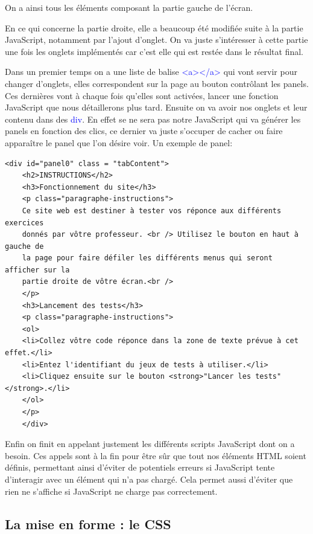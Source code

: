 \documentclass[a4paper]{article}
\renewcommand{\texttt}[2][blue]{\textcolor{#1}{\ttfamily #2}}
\begin{document}
  On a ainsi tous les éléments composant la partie gauche de l'écran.

  En ce qui concerne la partie droite, elle a beaucoup été modifiée suite à la
  partie JavaScript, notamment par l'ajout d'onglet. On va juste s'intéresser à
  cette partie une fois les onglets implémentés car c'est elle qui est restée dans le résultat
  final.

  Dans un premier temps on a une liste de balise \texttt{<a></a>} qui vont
  servir pour changer d'onglets, elles correspondent sur la page au bouton
  contrôlant les panels. Ces dernières vont à chaque fois qu'elles sont
  activées, lancer une fonction JavaScript que nous détaillerons plus tard.
  Ensuite on va avoir nos onglets et leur contenu dans des \texttt{div}. En
  effet se ne sera pas notre JavaScript qui va générer les panels en fonction
  des clics, ce dernier va juste s'occuper de cacher ou faire apparaître le
  panel que l'on désire voir. Un exemple de panel:

  \begin{lstlisting}[language=HTML5]
    <div id="panel0" class = "tabContent">
    <h2>INSTRUCTIONS</h2>
    <h3>Fonctionnement du site</h3>
    <p class="paragraphe-instructions">
    Ce site web est destiner à tester vos réponce aux différents exercices
    donnés par vôtre professeur. <br /> Utilisez le bouton en haut à gauche de
    la page pour faire défiler les différents menus qui seront afficher sur la
    partie droite de vôtre écran.<br />
    </p>
    <h3>Lancement des tests</h3>
    <p class="paragraphe-instructions">
    <ol>
    <li>Collez vôtre code réponce dans la zone de texte prévue à cet effet.</li>
    <li>Entez l'identifiant du jeux de tests à utiliser.</li>
    <li>Cliquez ensuite sur le bouton <strong>"Lancer les tests"</strong>.</li>
    </ol>
    </p>
    </div>
  \end{lstlisting}

  Enfin on finit en appelant justement les différents scripts JavaScript dont on
  a besoin. Ces appels sont à la fin pour être sûr que tout nos éléments HTML
  soient définis, permettant ainsi d'éviter de potentiels erreurs si JavaScript
  tente d'interagir avec un élément qui n'a pas chargé. Cela permet aussi
  d'éviter que rien ne s'affiche si JavaScript ne charge pas correctement.

\subsection{La mise en forme : le CSS}
  \label{subsec:css}
\end{document}
